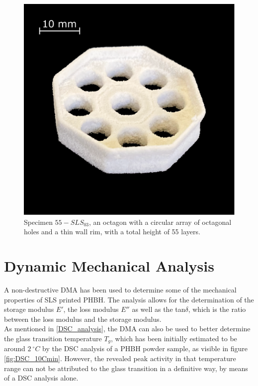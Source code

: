 \documentclass{article}
\begin{document}
        \begin{figure}[h!]
            \centering
            \includegraphics[width=\textwidth]{Pictures/Printed_parts/Fixed/octagon_holes.eps}
            \caption{Specimen $55-SLS_{03}$, an octagon with a circular array of octagonal holes and a thin wall rim, with a total height of 55 layers.}
            \label{fig:printed_specimens_octagonholes}
        \end{figure}
        

        \clearpage

    \section{Dynamic Mechanical Analysis\label{DMA}}
 
    A non-destructive DMA has been used to determine some of the mechanical properties of SLS printed PHBH. The analysis 
    allows for the determination of the storage modulus $E'$, the loss modulus $E''$ as well as the tan$\delta$, 
    which is the ratio between the loss modulus and the storage modulus. \\ 
    As mentioned in \ref{DSC_analysis}, the DMA can also be used to better determine the glass transition temperature $T_g$, which 
    has been initially estimated to be around $2 \ ^{\circ}C$ by the DSC analysis of a PHBH powder sample, as visible in figure \ref{fig:DSC_10Cmin}. 
    However, the revealed 
    peak activity in that temperature range can not be attributed to the glass transition in a definitive way, by means of a DSC analysis 
    alone. \\ 
\end{document}
